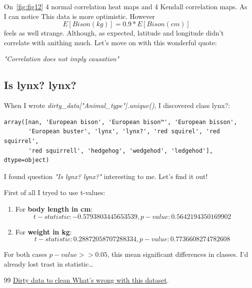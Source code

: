 \documentclass{article} %
\begin{document}
On~\ref{fig:fig12} 4 normal correlation heat maps
and 4 Kendall correlation maps. As I can notice
This data is more optimistic. However 
$$ E[Bison(kg)] = 0.9 * E[Bison(cm)] $$
feels as well strange.
Although, as expected, latitude and longitude didn't
correlate with anithing much.
Let's move on with this wonderful quote:

\textit{"Correlation does not imply causation" }

\subsection{Is lynx? lynx?}

When I wrote \textit{dirty\_data["Animal\_type"].unique()}, I discovered class lynx?:
\begin{verbatim}
array([nan, 'European bison', 'European bison™', 'European bisson',
       'European buster', 'lynx', 'lynx?', 'red squirel', 'red squirrel',
       'red squirrell', 'hedgehog', 'wedgehod', 'ledgehod'], dtype=object)
\end{verbatim}
I found question \textit{"Is lynx? lynx?"} interesting to me.
Let's find it out!

First of all I tryed to use t-values:
\begin{enumerate}
  \item For \textbf{body length in cm}: $$t-statistic: -0.5793803445653539, p-value: 0.5642194350169902$$
  \item For \textbf{weight in kg}: $$t-statistic: 0.28872058707288334, p-value: 0.7736608274782608$$
\end{enumerate}
For both cases $p-value >> 0.05$, this mean significant differences in classes. 
I'd already lost trast in statistic\dots

\begin{thebibliography}{99}
 \href{https://www.kaggle.com/datasets/joannanplkrk/dirty-data-to-clean-whats-wrong-with-this-dataset}{Dirty data to clean What's wrong with this dataset}.
\end{thebibliography}
\end{document}
